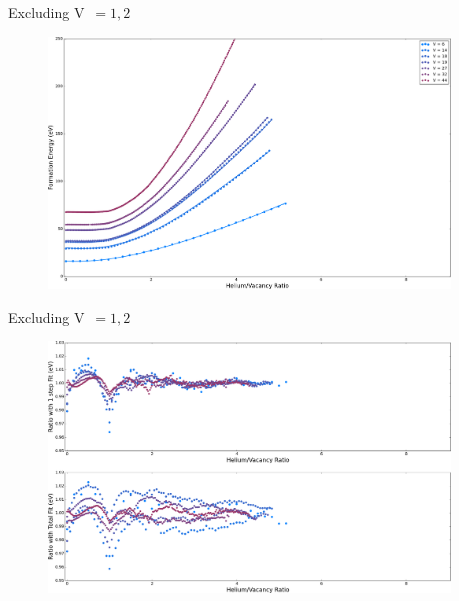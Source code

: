 \documentclass[10pt]{beamer}
\begin{document}
\begin{frame}{Excluding V~$=1, 2$}
	\begin{figure}
        \includegraphics[width=0.95\textwidth]{energyEX}
    \end{figure}
\end{frame}

\begin{frame}{Excluding V~$=1, 2$}
	\begin{figure}
        \includegraphics[width=0.95\textwidth]{ratioEX}
    \end{figure}
\end{frame}

% 
%     	
\end{document}
